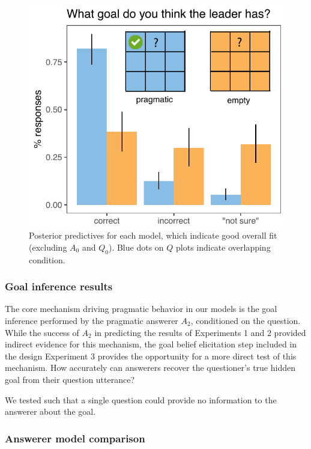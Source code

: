 \documentclass[12pt, floatsintext, jou]{apa6}
\begin{document}
\begin{figure}[tbh!]
\begin{center}
\includegraphics[scale = .7]{Exp3/spatialGoalInference_final.pdf}
\end{center}
\caption{Posterior predictives for each model, which indicate good overall fit (excluding $A_0$ and $Q_0$). Blue dots on $Q$ plots indicate overlapping condition.}
\label{fig:exp3goalinference}
\end{figure}

\subsubsection{Goal inference results}

The core mechanism driving pragmatic behavior in our models is the goal inference performed by the pragmatic answerer $A_2$, conditioned on the question. 
While the success of $A_2$ in predicting the results of Experiments 1 and 2 provided indirect evidence for this mechanism, the goal belief elicitation step included in the design Experiment 3 provides the opportunity for a more direct test of this mechanism.
How accurately can answerers recover the questioner's true hidden goal from their question utterance?

We tested such that a single question could provide no information to the answerer about the goal.

\subsubsection{Answerer model comparison}
\end{document}
